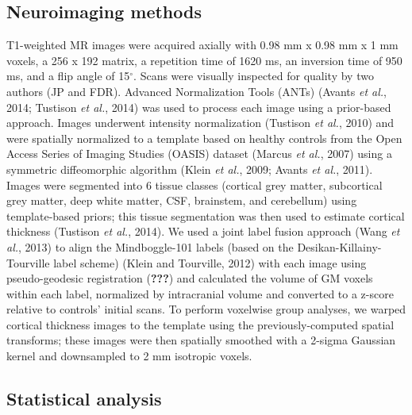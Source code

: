 \documentclass[]{article}
\begin{document}
\subsection*{Neuroimaging methods}\label{neuroimaging-methods}

T1-weighted MR images were acquired axially with 0.98 mm x 0.98 mm x 1
mm voxels, a 256 x 192 matrix, a repetition time of 1620 ms, an
inversion time of 950 ms, and a flip angle of 15\(^\circ\). Scans were
visually inspected for quality by two authors (JP and FDR). Advanced
Normalization Tools (ANTs) (Avants \emph{et al.}, 2014; Tustison
\emph{et al.}, 2014) was used to process each image using a prior-based
approach. Images underwent intensity normalization (Tustison \emph{et
al.}, 2010) and were spatially normalized to a template based on healthy
controls from the Open Access Series of Imaging Studies (OASIS) dataset
(Marcus \emph{et al.}, 2007) using a symmetric diffeomorphic algorithm
(Klein \emph{et al.}, 2009; Avants \emph{et al.}, 2011). Images were
segmented into 6 tissue classes (cortical grey matter, subcortical grey
matter, deep white matter, CSF, brainstem, and cerebellum) using
template-based priors; this tissue segmentation was then used to
estimate cortical thickness (Tustison \emph{et al.}, 2014). We used a
joint label fusion approach (Wang \emph{et al.}, 2013) to align the
Mindboggle-101 labels (based on the Desikan-Killainy-Tourville label
scheme) (Klein and Tourville, 2012) with each image using
pseudo-geodesic registration ({\textbf{???}}) and calculated the volume
of GM voxels within each label, normalized by intracranial volume and
converted to a z-score relative to controls' initial scans. To perform
voxelwise group analyses, we warped cortical thickness images to the
template using the previously-computed spatial transforms; these images
were then spatially smoothed with a 2-sigma Gaussian kernel and
downsampled to 2 mm isotropic voxels.

\subsection*{Statistical analysis}\label{statistical-analysis}
\end{document}
